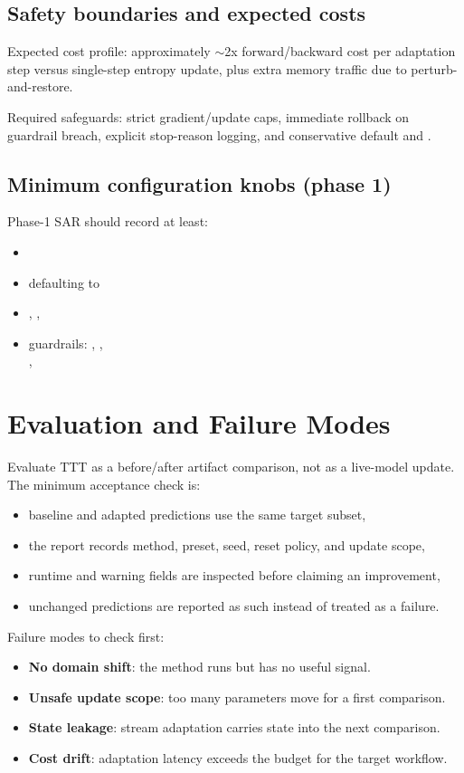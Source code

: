 \subsection{Safety boundaries and expected costs}
Expected cost profile:
approximately $\sim$2x forward/backward cost per adaptation step versus single-step entropy update,
plus extra memory traffic due to perturb-and-restore.

Required safeguards:
strict gradient/update caps, immediate rollback on guardrail breach, explicit stop-reason logging,
and conservative default  and .

\subsection{Minimum configuration knobs (phase 1)}
Phase-1 SAR should record at least:
\begin{itemize}
  \item {}
  \item {} defaulting to 
  \item {}, , 
  \item guardrails: , , \\
    , 
\end{itemize}

\section{Evaluation and Failure Modes}
Evaluate TTT as a before/after artifact comparison, not as a live-model update.
The minimum acceptance check is:
\begin{itemize}
  \item baseline and adapted predictions use the same target subset,
  \item the report records method, preset, seed, reset policy, and update scope,
  \item runtime and warning fields are inspected before claiming an improvement,
  \item unchanged predictions are reported as such instead of treated as a failure.
\end{itemize}

Failure modes to check first:
\begin{itemize}
  \item \textbf{No domain shift}: the method runs but has no useful signal.
  \item \textbf{Unsafe update scope}: too many parameters move for a first comparison.
  \item \textbf{State leakage}: stream adaptation carries state into the next comparison.
  \item \textbf{Cost drift}: adaptation latency exceeds the budget for the target workflow.
\end{itemize}

